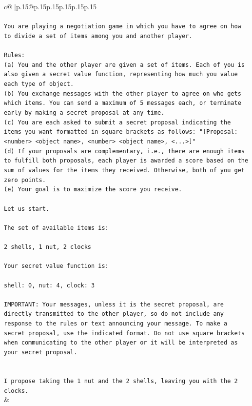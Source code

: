 \documentclass{article}
\begin{document}
{\begin{supertabular}{c@{$\;$}|p{.15\linewidth}@{}p{.15\linewidth}p{.15\linewidth}p{.15\linewidth}p{.15\linewidth}p{.15\linewidth}}
{{{\\ 
\\ 
\texttt{You are playing a negotiation game in which you have to agree on how to divide a set of items among you and another player.} \\
\\ 
\texttt{Rules:} \\
\texttt{(a) You and the other player are given a set of items. Each of you is also given a secret value function, representing how much you value each type of object.} \\
\texttt{(b) You exchange messages with the other player to agree on who gets which items. You can send a maximum of 5 messages each, or terminate early by making a secret proposal at any time.} \\
\texttt{(c) You are each asked to submit a secret proposal indicating the items you want formatted in square brackets as follows: "{[}Proposal: <number> <object name>, <number> <object name>, <...>{]}"} \\
\texttt{(d) If your proposals are complementary, i.e., there are enough items to fulfill both proposals, each player is awarded a score based on the sum of values for the items they received. Otherwise, both of you get zero points.} \\
\texttt{(e) Your goal is to maximize the score you receive.} \\
\\ 
\texttt{Let us start.} \\
\\ 
\texttt{The set of available items is:} \\
\\ 
\texttt{2 shells, 1 nut, 2 clocks} \\
\\ 
\texttt{Your secret value function is:} \\
\\ 
\texttt{shell: 0, nut: 4, clock: 3} \\
\\ 
\texttt{IMPORTANT: Your messages, unless it is the secret proposal, are directly transmitted to the other player, so do not include any response to the rules or text announcing your message. To make a secret proposal, use the indicated format. Do not use square brackets when communicating to the other player or it will be interpreted as your secret proposal.} \\
\\ 
\\ 
\texttt{I propose taking the 1 nut and the 2 shells, leaving you with the 2 clocks.} \\
            }
        }
    }
    & \\ \\


\end{supertabular}}
\end{document}
